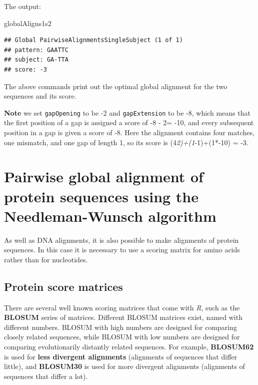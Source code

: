 \documentclass[
]{book}
\newenvironment{Shaded}{\begin{snugshade}}{\end{snugshade}}
\newcommand{\NormalTok}[1]{#1}
\begin{document}
The output:

\begin{Shaded}
\begin{Highlighting}[]
\NormalTok{globalAligns1s2 }
\end{Highlighting}
\end{Shaded}

\begin{verbatim}
## Global PairwiseAlignmentsSingleSubject (1 of 1)
## pattern: GAATTC
## subject: GA-TTA
## score: -3
\end{verbatim}

The above commands print out the optimal global alignment for the two sequences and its score.

\textbf{Note} we set \texttt{gapOpening} to be -2 and \texttt{gapExtension} to be -8, which means that the first position of a gap is assigned a score of -8 - 2= -10, and every subsequent position in a gap is given a score of -8. Here the alignment contains four matches, one mismatch, and one gap of length 1, so its score is (4\emph{2)+(1}-1)+(1*-10) = -3.

\hypertarget{pairwise-global-alignment-of-protein-sequences-using-the-needleman-wunsch-algorithm}{%
\section{Pairwise global alignment of protein sequences using the Needleman-Wunsch algorithm}\label{pairwise-global-alignment-of-protein-sequences-using-the-needleman-wunsch-algorithm}}

As well as DNA alignments, it is also possible to make alignments of protein sequences. In this case it is necessary to use a scoring matrix for amino acids rather than for nucleotides.

\hypertarget{protein-score-matrices}{%
\subsection{Protein score matrices}\label{protein-score-matrices}}

There are several well known scoring matrices that come with \emph{R}, such as the \textbf{BLOSUM} series of matrices. Different BLOSUM matrices exist, named with different numbers. BLOSUM with high numbers are designed for comparing closely related sequences, while BLOSUM with low numbers are designed for comparing evolutionarily distantly related sequences. For example, \textbf{BLOSUM62} is used for \textbf{less divergent alignments} (alignments of sequences that differ little), and \textbf{BLOSUM30} is used for more divergent alignments (alignments of sequences that differ a lot).
\end{document}
